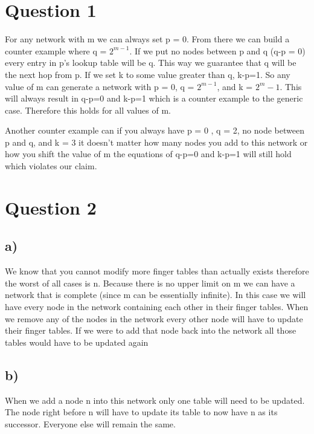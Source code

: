 \documentclass[12pt]{article}
\begin{document}
\section{Question 1} %
\label{sec:question_1}
For any network with m we can always set p = 0. From there we can build a counter example where q = $2^{m-1}$. If we put no nodes between p and q (q-p = 0) every entry in p's lookup table will be q. This way we guarantee that q will be the next hop from p. If we set k to some value greater than q, k-p=1. So any value of m can generate a network with p = 0, q = $2^{m-1}$, and k = $2^m-1$. This will always result in q-p=0 and k-p=1 which is a counter example to the generic case. Therefore this holds for all values of m. 


Another counter example can if you always have p = 0 , q = 2, no node between p and q, and k = 3 it doesn't matter how many nodes you add to this network or how you shift the value of m the equations of q-p=0 and k-p=1 will still hold which violates our claim. 


\section{Question 2} %
\label{sec:question_2}

\subsection{a)} %
\label{sub:a_}
We know that you cannot modify more finger tables than actually exists therefore the worst of all cases is n. Because there is no upper limit on m we can have a network that is complete (since m can be essentially infinite). In this case we will have every node in the network containing each other in their finger tables. When we remove any of the nodes in the network every other node will have to update their finger tables. If we were to add that node back into the network all those tables would have to be updated again

\subsection{b)} %
\label{sub:b_}
When we add a node n into this network only one table will need to be updated. The node right before n will have to update its table to now have n as its successor. Everyone else will remain the same.
\end{document}
